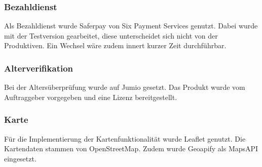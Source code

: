 \subsubsection{Bezahldienst}
Als Bezahldienst wurde Saferpay von Six Payment Services genutzt. Dabei wurde mit der Testversion gearbeitet, diese unterscheidet sich nicht von der Produktiven. Ein Wechsel wäre zudem innert kurzer Zeit durchführbar. 

\subsubsection{Alterverifikation}
Bei der Altersüberprüfung wurde auf Jumio gesetzt. Das Produkt wurde vom Auftraggeber vorgegeben und eine Lizenz bereitgestellt. 

\subsubsection{Karte}
Für die Implementierung der Kartenfunktionalität wurde Leaflet genutzt. Die Kartendaten stammen von OpenStreetMap. Zudem wurde Geoapify als MapsAPI eingesetzt. 

\newpage